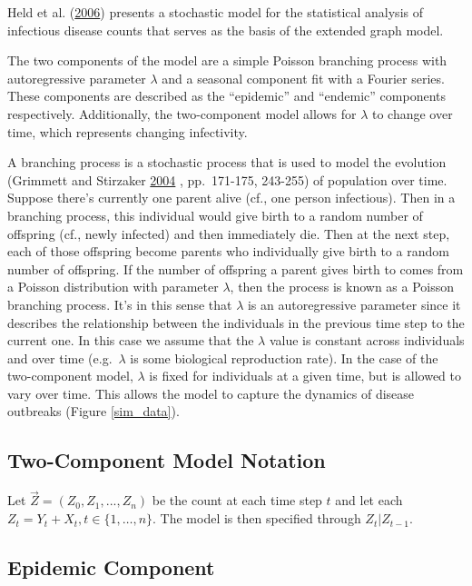 \documentclass[11pt,a4paper]{article}
\begin{document}
Held et al. (\protect\hyperlink{ref-held_two-component_2006}{2006})
presents a stochastic model for the statistical analysis of infectious
disease counts that serves as the basis of the extended graph model.

The two components of the model are a simple Poisson branching process
with autoregressive parameter \(\lambda\) and a seasonal component fit
with a Fourier series. These components are described as the
``epidemic'' and ``endemic'' components respectively. Additionally, the
two-component model allows for \(\lambda\) to change over time, which
represents changing infectivity.

A branching process is a stochastic process that is used to model the
evolution (Grimmett and Stirzaker
\protect\hyperlink{ref-grimmett_probability_2004}{2004} , pp.~171-175,
243-255) of population over time. Suppose there's currently one parent
alive (cf., one person infectious). Then in a branching process, this
individual would give birth to a random number of offspring (cf., newly
infected) and then immediately die. Then at the next step, each of those
offspring become parents who individually give birth to a random number
of offspring. If the number of offspring a parent gives birth to comes
from a Poisson distribution with parameter \(\lambda\), then the process
is known as a Poisson branching process. It's in this sense that
\(\lambda\) is an autoregressive parameter since it describes the
relationship between the individuals in the previous time step to the
current one. In this case we assume that the \(\lambda\) value is
constant across individuals and over time (e.g.~\(\lambda\) is some
biological reproduction rate). In the case of the two-component model,
\(\lambda\) is fixed for individuals at a given time, but is allowed to
vary over time. This allows the model to capture the dynamics of disease
outbreaks (Figure \ref{sim_data}).

\hypertarget{two-component-model-notation}{%
\subsection{Two-Component Model
Notation}\label{two-component-model-notation}}

Let \(\vec{Z} = (Z_0, Z_1, ..., Z_n)\) be the count at each time step
\(t\) and let each \(Z_t= Y_t + X_t, t\in \{1,\dots, n\}\). The model is
then specified through \(Z_t | Z_{t-1}\).

\hypertarget{epidemic-component}{%
\subsection{Epidemic Component}\label{epidemic-component}}
\end{document}
